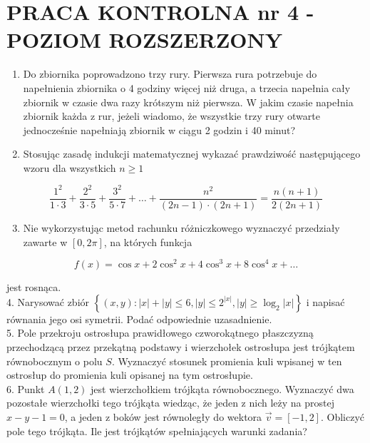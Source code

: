 \documentclass[10pt]{article}
\begin{document}
\section*{PRACA KONTROLNA nr 4 - POZIOM ROZSZERZONY}
\begin{enumerate}
  \item Do zbiornika poprowadzono trzy rury. Pierwsza rura potrzebuje do napełnienia zbiornika o 4 godziny więcej niż druga, a trzecia napełnia cały zbiornik w czasie dwa razy krótszym niż pierwsza. W jakim czasie napełnia zbiornik każda z rur, jeżeli wiadomo, że wszystkie trzy rury otwarte jednocześnie napełniają zbiornik w ciągu 2 godzin i 40 minut?
  \item Stosując zasadę indukcji matematycznej wykazać prawdziwość następującego wzoru dla wszystkich $n \geqslant 1$
\end{enumerate}

$$
\frac{1^{2}}{1 \cdot 3}+\frac{2^{2}}{3 \cdot 5}+\frac{3^{2}}{5 \cdot 7}+\ldots+\frac{n^{2}}{(2 n-1) \cdot(2 n+1)}=\frac{n(n+1)}{2(2 n+1)}
$$

\begin{enumerate}
  \setcounter{enumi}{2}
  \item Nie wykorzystując metod rachunku różniczkowego wyznaczyć przedziały zawarte w $[0,2 \pi]$, na których funkcja
\end{enumerate}

$$
f(x)=\cos x+2 \cos ^{2} x+4 \cos ^{3} x+8 \cos ^{4} x+\ldots
$$

jest rosnąca.\\
4. Narysować zbiór $\left\{(x, y):|x|+|y| \leqslant 6,|y| \leqslant 2^{|x|},|y| \geqslant \log _{2}|x|\right\}$ i napisać równania jego osi symetrii. Podać odpowiednie uzasadnienie.\\
5. Pole przekroju ostrosłupa prawidłowego czworokątnego płaszczyzną przechodzącą przez przekątną podstawy i wierzchołek ostrosłupa jest trójkątem równobocznym o polu $S$. Wyznaczyć stosunek promienia kuli wpisanej w ten ostrosłup do promienia kuli opisanej na tym ostrosłupie.\\
6. Punkt $A(1,2)$ jest wierzchołkiem trójkąta równobocznego. Wyznaczyć dwa pozostałe wierzchołki tego trójkąta wiedząc, że jeden z nich leży na prostej $x-y-1=0$, a jeden z boków jest równoległy do wektora $\vec{v}=[-1,2]$. Obliczyć pole tego trójkąta. Ile jest trójkątów spełniających warunki zadania?
\end{document}
